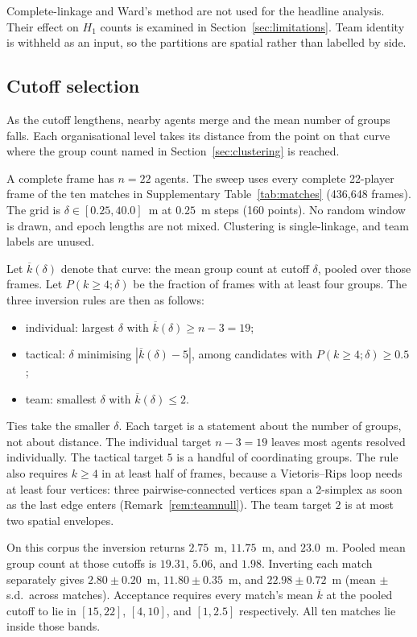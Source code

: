 Complete-linkage and Ward's method are not used for the headline
analysis. Their effect on $H_1$ counts is examined in
Section~\ref{sec:limitations}. Team identity is withheld as an input,
so the partitions are spatial rather than labelled by side.

\subsection{Cutoff selection}
\label{sec:cutoffselection}

As the cutoff lengthens, nearby agents merge and the mean number of
groups falls. Each organisational level takes its distance from the
point on that curve where the group count named in
Section~\ref{sec:clustering} is reached.

A complete frame has $n=22$ agents. The sweep uses every complete
22-player frame of the ten matches in Supplementary
Table~\ref{tab:matches} (436{,}648 frames). The grid is
$\delta\in[0.25, 40.0]$~m at $0.25$~m steps (160 points). No random
window is drawn, and epoch lengths are not mixed. Clustering is
single-linkage, and team labels are unused.

Let $\overline{k}(\delta)$ denote that curve: the mean group count
at cutoff $\delta$, pooled over those frames. Let $P(k\ge 4;\delta)$
be the fraction of frames with at least four groups. The three
inversion rules are then as follows:

\begin{itemize}
\item individual: largest $\delta$ with $\overline{k}(\delta)\ge n-3=19$;
\item tactical: $\delta$ minimising
$|\overline{k}(\delta)-5|$, among candidates with
$P(k\ge 4;\delta)\ge 0.5$;
\item team: smallest $\delta$ with $\overline{k}(\delta)\le 2$.
\end{itemize}
Ties take the smaller $\delta$. Each target is a statement about the
number of groups, not about distance. The individual target
$n-3=19$ leaves most agents resolved individually. The tactical
target $5$ is a handful of coordinating groups. The rule also requires
$k\ge 4$ in at least half of frames, because a Vietoris--Rips loop
needs at least four vertices: three pairwise-connected vertices span a
2-simplex as soon as the last edge enters
(Remark~\ref{rem:teamnull}). The team target $2$ is at
most two spatial envelopes.

On this corpus the inversion returns $2.75$~m, $11.75$~m, and
$23.0$~m. Pooled mean group count at those cutoffs is $19.31$,
$5.06$, and $1.98$. Inverting each match separately gives
$2.80\pm 0.20$~m, $11.80\pm 0.35$~m, and $22.98\pm 0.72$~m
(mean $\pm$ s.d.\ across matches). Acceptance requires every match's
mean $\overline{k}$ at the pooled cutoff to lie in $[15, 22]$,
$[4, 10]$, and $[1, 2.5]$ respectively. All ten matches lie inside
those bands.

